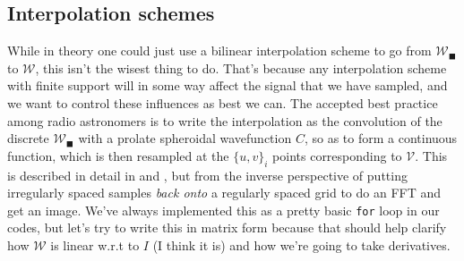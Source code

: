 \documentclass[modern]{aastex62}
\newcommand{\vd}{\boldsymbol{\mathcal{V}}} %
\newcommand{\vm}{\boldsymbol{\mathcal{W}}} %
\begin{document}
\subsection{Interpolation schemes}
While in theory one could just use a bilinear interpolation scheme to go from $\vm_\blacksquare$ to $\vm$, this isn't the wisest thing to do. That's because any interpolation scheme with finite support will in some way affect the signal that we have sampled, and we want to control these influences as best we can. The accepted best practice among radio astronomers is to write the interpolation as the convolution of the discrete $\vm_\blacksquare$ with a prolate spheroidal wavefunction $C$, so as to form a continuous function, which is then resampled at the $\{ u, v\}_i$ points corresponding to $\vd$. This is described in detail in \citet[ch 7.3,][]{synthesis99} and \citet{schwab84}, but from the inverse perspective of putting irregularly spaced samples \emph{back onto} a regularly spaced grid to do an FFT and get an image. We've always implemented this as a pretty basic \texttt{for} loop in our codes, but let's try to write this in matrix form because that should help clarify how $\vm$ is linear w.r.t to $I$ (I think it is) and how we're going to take derivatives.
\end{document}
